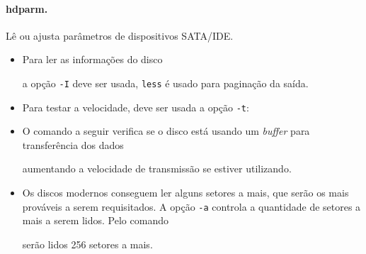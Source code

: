 \paragraph{hdparm.} Lê ou ajusta parâmetros de dispositivos SATA/IDE.

\begin{itemize}
\item Para ler as informações do disco


  \noindent a opção {\tt -I} deve ser usada, {\tt less} é usado para
  paginação da saída.

\item Para testar a velocidade, deve ser usada a opção {\tt -t}:


\item O comando a seguir verifica se o disco está usando um {\em buffer} 
  para transferência dos dados


  \noindent  aumentando a velocidade de transmissão  se estiver utilizando.

\item Os discos modernos conseguem ler alguns setores a mais, que serão os mais 
  prováveis a serem requisitados. A opção {\tt -a} controla a quantidade 
  de setores a mais a serem lidos. Pelo comando


  serão lidos 256 setores a mais.

\end{itemize}

